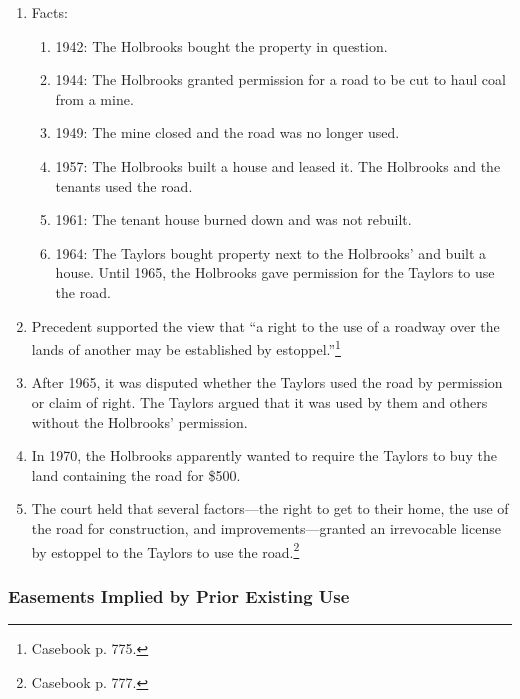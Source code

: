 \begin{enumerate}
    \item Facts:
    \begin{enumerate}
        \item 1942: The Holbrooks bought the property in question.
        \item 1944: The Holbrooks granted permission for a road to be cut to 
        haul coal from a mine.
        \item 1949: The mine closed and the road was no longer used.
        \item 1957: The Holbrooks built a house and leased it. The Holbrooks 
        and the tenants used the road.
        \item 1961: The tenant house burned down and was not rebuilt.
        \item 1964: The Taylors bought property next to the Holbrooks' and 
        built a house. Until 1965, the Holbrooks gave permission for the 
        Taylors to use the road.
    \end{enumerate}
    \item Precedent supported the view that ``a right to the use of a roadway 
    over the lands of another may be established by 
    estoppel.''\footnote{Casebook p. 775.}
    \item After 1965, it was disputed whether the Taylors used the road by 
    permission or claim of right. The Taylors argued that it was used by them 
    and others without the Holbrooks' permission.
    \item In 1970, the Holbrooks apparently wanted to require the Taylors to 
    buy the land containing the road for \$500.
    \item The court held that several factors---the right to get to their 
    home, the use of the road for construction, and improvements---granted an 
    irrevocable license by estoppel to the Taylors to use the 
    road.\footnote{Casebook p. 777.}
\end{enumerate}

\subsubsection{Easements Implied by Prior Existing Use}

